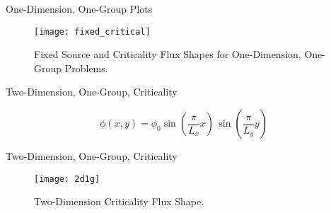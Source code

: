 \begin{frame}{One-Dimension, One-Group Plots}
  \begin{figure}
    \centering
    \texttt{[image: fixed\_critical]}
    \caption{Fixed Source and Criticality Flux Shapes for One-Dimension,
      One-Group Problems.}
    \label{fig:fixed_critical}
  \end{figure}
\end{frame}

\begin{frame}{Two-Dimension, One-Group, Criticality}
  \begin{table}
    \label{tab:2d1g}
    \begin{center}
    \end{center}
  \end{table}
  \begin{equation}
    \label{eq:analytic_2d1g}
    \phi(x,y) = \phi_0 \sin\left(\frac{\pi}{L_x} x\right) \, 
      \sin\left(\frac{\pi}{L_y} y\right)
  \end{equation}
\end{frame}

\begin{frame}{Two-Dimension, One-Group, Criticality}
  \begin{figure}
    \centering
    \texttt{[image: 2d1g]}
    \caption{Two-Dimension Criticality Flux Shape.}
    \label{fig:2d1g}
  \end{figure}
\end{frame}

